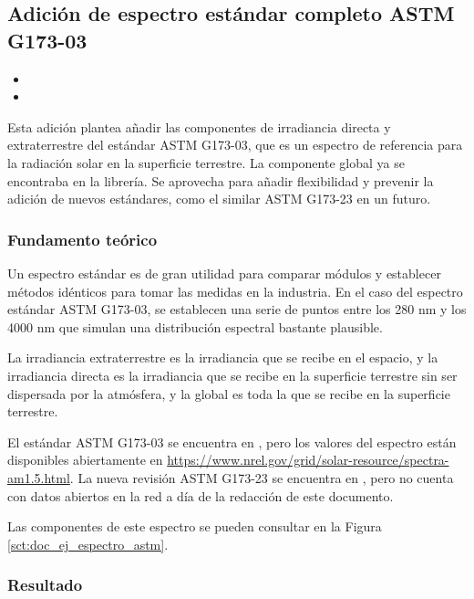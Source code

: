 \subsection{Adición de espectro \gls{estándar} completo ASTM G173-03}

\begin{itemize}
    \item {}
    \item {}
\end{itemize}

Esta adición plantea añadir las componentes de irradiancia \gls{directa} y extraterrestre del estándar ASTM G173-03, que es un espectro de referencia para la \gls{radiación solar} en la superficie terrestre. La componente global ya se encontraba en la librería. Se aprovecha para añadir flexibilidad y prevenir la adición de nuevos estándares, como el similar ASTM G173-23 en un futuro.

\subsubsection{Fundamento teórico}

Un \gls{espectro estándar} es de gran utilidad para comparar módulos y establecer métodos idénticos para tomar las medidas en la industria. En el caso del espectro estándar ASTM G173-03, se establecen una serie de puntos entre los 280 nm y los 4000 nm que simulan una distribución espectral bastante plausible.

La irradiancia extraterrestre es la irradiancia que se recibe en el espacio, y la irradiancia directa es la irradiancia que se recibe en la superficie terrestre sin ser dispersada por la atmósfera, y la global es toda la que se recibe en la superficie terrestre.

El \gls{estándar} ASTM G173-03 se encuentra en \cite{astm_g173-03}, pero los valores del espectro están disponibles abiertamente en \url{https://www.nrel.gov/grid/solar-resource/spectra-am1.5.html}.
La nueva revisión ASTM G173-23 se encuentra en \cite{astm_g173-23}, pero no cuenta con datos abiertos en la red a día de la redacción de este documento.

Las componentes de este espectro se pueden consultar en la Figura \ref{sct:doc_ej_espectro_astm}.

\subsubsection{Resultado}

